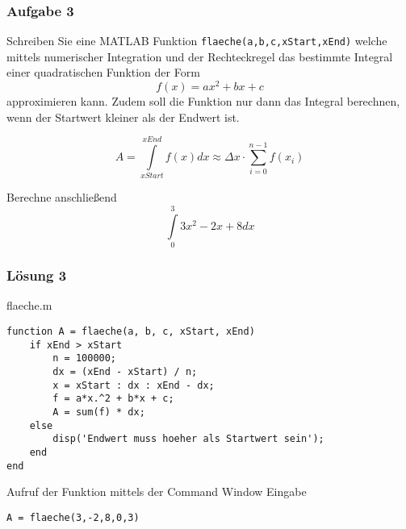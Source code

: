         \subsubsection*{Aufgabe 3}
        Schreiben Sie eine MATLAB Funktion \texttt{flaeche(a,b,c,xStart,xEnd)} welche mittels numerischer Integration und der Rechteckregel das bestimmte Integral einer quadratischen Funktion der Form \[f(x) = ax^2 + bx + c \] approximieren kann. Zudem soll die Funktion nur dann das Integral berechnen, wenn der Startwert kleiner als der Endwert ist.

        \[A=\int\limits_{xStart}^{xEnd}{f(x) dx} \approx \Delta x \cdot \sum_{i=0}^{n-1}f(x_i)\]

        Berechne anschließend
        \[\int\limits_{0}^{3}3x^2 - 2x +8 dx\]
        \subsubsection*{Lösung 3}
        \begin{Codelösung}{flaeche.m}
                \begin{lstlisting}
function A = flaeche(a, b, c, xStart, xEnd)
    if xEnd > xStart
        n = 100000;
        dx = (xEnd - xStart) / n;
        x = xStart : dx : xEnd - dx;
        f = a*x.^2 + b*x + c;
        A = sum(f) * dx;
    else
        disp('Endwert muss hoeher als Startwert sein');
    end
end
                \end{lstlisting}
        \end{Codelösung}

        \noindent Aufruf der Funktion mittels der Command Window Eingabe
        
        \begin{center}
                \texttt{A = flaeche(3,-2,8,0,3)}
        \end{center}
        